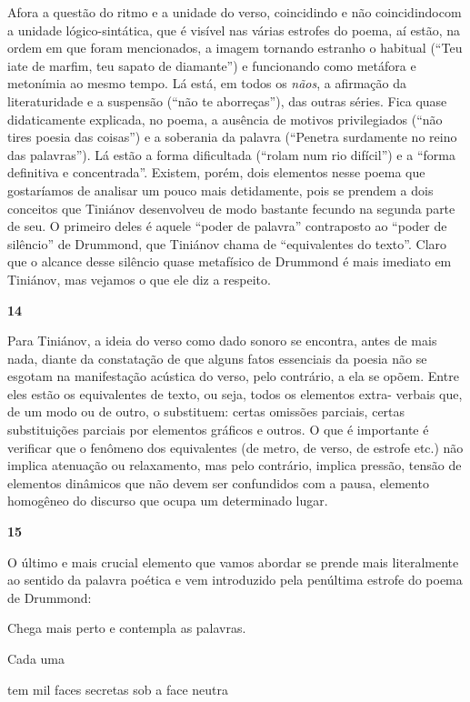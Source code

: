 Afora a questão do ritmo e a unidade do verso, coincidindo e não
coincidindocom a unidade lógico-sintática, que é visível nas várias
estrofes do poema, aí estão, na ordem em que foram mencionados, a imagem
tornando estranho o habitual (``Teu iate de marfim, teu sapato de
diamante'') e funcionando como metáfora e metonímia ao mesmo tempo. Lá
está, em todos os \emph{nãos}, a afirmação da literaturidade e a
suspensão (``não te aborreças''), das outras séries. Fica quase
didaticamente explicada, no poema, a ausência de motivos privilegiados
(``não tires poesia das coisas'') e a soberania da palavra (``Penetra
surdamente no reino das palavras''). Lá estão a forma dificultada
(``rolam num rio difícil'') e a ``forma definitiva e concentrada''.
Existem, porém, dois elementos nesse poema que gostaríamos de analisar
um pouco mais detidamente, pois se prendem a dois conceitos que Tiniánov
desenvolveu de modo bastante fecundo na segunda parte de seu. O primeiro
deles é aquele ``poder de palavra'' contraposto ao ``poder de silêncio''
de Drummond, que Tiniánov chama de ``equivalentes do texto''. Claro que
o alcance desse silêncio quase metafísico de Drummond é mais imediato em
Tiniánov, mas vejamos o que ele diz a respeito.

\textbf{14}

Para Tiniánov, a ideia do verso como dado sonoro se encontra, antes de
mais nada, diante da constatação de que alguns fatos essenciais da
poesia não se esgotam na manifestação acústica do verso, pelo contrário,
a ela se opõem. Entre eles estão os equivalentes de texto, ou seja,
todos os elementos extra- verbais que, de um modo ou de outro, o
substituem: certas omissões parciais, certas substituições parciais por
elementos gráficos e outros. O que é importante é verificar que o
fenômeno dos equivalentes (de metro, de verso, de estrofe etc.) não
implica atenuação ou relaxamento, mas pelo contrário, implica pressão,
tensão de elementos dinâmicos que não devem ser confundidos com a pausa,
elemento homogêneo do discurso que ocupa um determinado lugar.

\textbf{15}

O último e mais crucial elemento que vamos abordar se prende mais
literalmente ao sentido da palavra poética e vem introduzido pela
penúltima estrofe do poema de Drummond:

Chega mais perto e contempla as palavras.

Cada uma

tem mil faces secretas sob a face neutra

